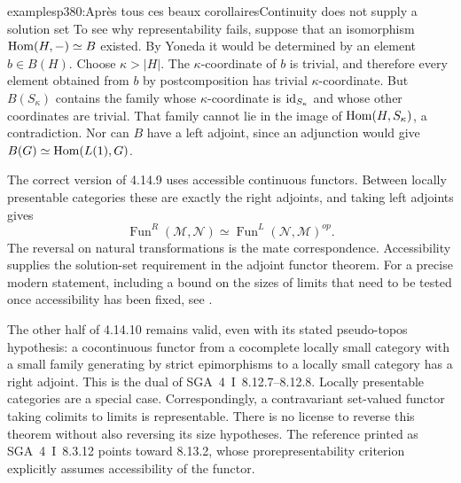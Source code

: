 \begin{dcomment}{examples}{p380:Après tous ces beaux corollaires}{Continuity does not supply a solution set}
To see why representability fails, suppose that an isomorphism $\operatorname{Hom}(H,-)\simeq B$ existed. By Yoneda it would be determined by an element $b\in B(H)$. Choose $\kappa>|H|$. The $\kappa$-coordinate of $b$ is trivial, and therefore every element obtained from $b$ by postcomposition has trivial $\kappa$-coordinate. But $B(S_\kappa)$ contains the family whose $\kappa$-coordinate is $\mathrm{id}_{S_\kappa}$ and whose other coordinates are trivial. That family cannot lie in the image of $\operatorname{Hom}(H,S_\kappa)$, a contradiction. Nor can $B$ have a left adjoint, since an adjunction would give $B(G)\simeq\operatorname{Hom}(L(1),G)$.

The correct version of 4.14.9 uses accessible continuous functors. Between locally presentable categories these are exactly the right adjoints, and taking left adjoints gives
\[
 \operatorname{Fun}^{R}(\mathcal M,\mathcal N)
 \simeq
 \operatorname{Fun}^{L}(\mathcal N,\mathcal M)^{op}.
\]
The reversal on natural transformations is the mate correspondence. Accessibility supplies the solution-set requirement in the adjoint functor theorem. For a precise modern statement, including a bound on the sizes of limits that need to be tested once accessibility has been fixed, see \citet[Theorems~2.9 and~2.11]{Tendas2022Continuity}.

The other half of 4.14.10 remains valid, even with its stated pseudo-topos hypothesis: a cocontinuous functor from a cocomplete locally small category with a small family generating by strict epimorphisms to a locally small category has a right adjoint. This is the dual of SGA~4~I~8.12.7--8.12.8. Locally presentable categories are a special case. Correspondingly, a contravariant set-valued functor taking colimits to limits is representable. There is no license to reverse this theorem without also reversing its size hypotheses. The reference printed as SGA~4~I~8.3.12 points toward 8.13.2, whose prorepresentability criterion explicitly assumes accessibility of the functor.
\end{dcomment}


